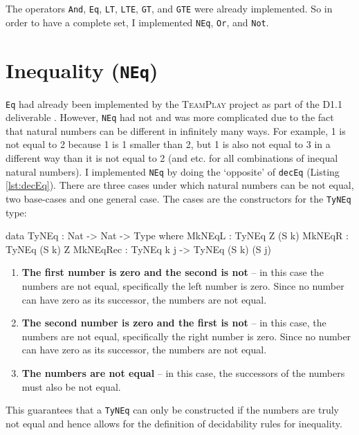         The operators \texttt{And}, \texttt{Eq}, \texttt{LT}, \texttt{LTE}, \texttt{GT}, and \texttt{GTE} were already implemented. So in order to have a complete set, I implemented \texttt{NEq}, \texttt{Or}, and \texttt{Not}.

\section{Inequality (\texttt{NEq})}
    \texttt{Eq} had already been implemented by the \textsc{TeamPlay} project as part of the D1.1 deliverable \cite{teamplay:d1.1}. However, \texttt{NEq} had not and was more complicated due to the fact that natural numbers can be different in infinitely many ways. For example, 1 is not equal to 2 because 1 is 1 smaller than 2, but 1 is also not equal to 3 in a different way than it is not equal to 2 (and etc. for all combinations of inequal natural numbers). I implemented \texttt{NEq} by doing the `opposite' of \texttt{decEq} (Listing \ref{lst:decEq}). There are three cases under which natural numbers can be not equal, two base-cases and one general case. The cases are the constructors for the \texttt{TyNEq} type:
    \begin{code}[caption={\texttt{TyNEq}} -- proving inequality.]
        data TyNEq : Nat -> Nat -> Type where
        MkNEqL   : TyNEq Z (S k)
        MkNEqR   : TyNEq (S k) Z
        MkNEqRec : TyNEq k j -> TyNEq (S k) (S j)
    \end{code}
    \begin{enumerate}
        \item \textbf{The first number is zero and the second is not} -- in this case the numbers are not equal, specifically the left number is zero. Since no number can have zero as its successor, the numbers are not equal.
        \item \textbf{The second number is zero and the first is not} -- in this case, the numbers are not equal, specifically the right number is zero. Since no number can have zero as its successor, the numbers are not equal.
        \item \textbf{The numbers are not equal} -- in this case, the successors of the numbers must also be not equal.
    \end{enumerate}
    This guarantees that a \texttt{TyNEq} can only be constructed if the numbers are truly not equal and hence allows for the definition of decidability rules for inequality.

